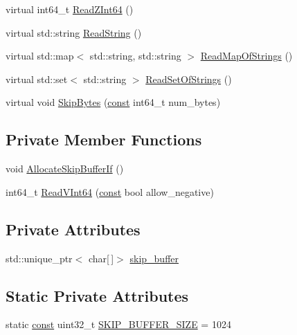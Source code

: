 \begin{DoxyCompactItemize}
\item 
virtual int64\+\_\+t \mbox{\hyperlink{classlucene_1_1core_1_1store_1_1DataInput_a978b9682ae5a7045e3f0181ad32ecaa2}{Read\+Z\+Int64}} ()
\item 
virtual std\+::string \mbox{\hyperlink{classlucene_1_1core_1_1store_1_1DataInput_a86a272d3eaf2f18b68669ce8eb181c85}{Read\+String}} ()
\item 
virtual std\+::map$<$ std\+::string, std\+::string $>$ \mbox{\hyperlink{classlucene_1_1core_1_1store_1_1DataInput_a92ceac1fbe1d997031ecc57bf5e9306a}{Read\+Map\+Of\+Strings}} ()
\item 
virtual std\+::set$<$ std\+::string $>$ \mbox{\hyperlink{classlucene_1_1core_1_1store_1_1DataInput_a7d641dfa95887c123b813308c290b2c5}{Read\+Set\+Of\+Strings}} ()
\item 
virtual void \mbox{\hyperlink{classlucene_1_1core_1_1store_1_1DataInput_a0b083e18dc6254067375f4ac2bc9fefa}{Skip\+Bytes}} (\mbox{\hyperlink{ZlibCrc32_8h_a2c212835823e3c54a8ab6d95c652660e}{const}} int64\+\_\+t num\+\_\+bytes)
\end{DoxyCompactItemize}
\subsection*{Private Member Functions}
\begin{DoxyCompactItemize}
\item 
void \mbox{\hyperlink{classlucene_1_1core_1_1store_1_1DataInput_a6303bc9a57618fdd930404bc8cd65d4d}{Allocate\+Skip\+Buffer\+If}} ()
\item 
int64\+\_\+t \mbox{\hyperlink{classlucene_1_1core_1_1store_1_1DataInput_abdf472f02e6391e659b94f01776bc2b5}{Read\+V\+Int64}} (\mbox{\hyperlink{ZlibCrc32_8h_a2c212835823e3c54a8ab6d95c652660e}{const}} bool allow\+\_\+negative)
\end{DoxyCompactItemize}
\subsection*{Private Attributes}
\begin{DoxyCompactItemize}
\item 
std\+::unique\+\_\+ptr$<$ char\mbox{[}$\,$\mbox{]}$>$ \mbox{\hyperlink{classlucene_1_1core_1_1store_1_1DataInput_a83f28d696cfd51b6ae0fe7b08f0d3ed6}{skip\+\_\+buffer}}
\end{DoxyCompactItemize}
\subsection*{Static Private Attributes}
\begin{DoxyCompactItemize}
\item 
static \mbox{\hyperlink{ZlibCrc32_8h_a2c212835823e3c54a8ab6d95c652660e}{const}} uint32\+\_\+t \mbox{\hyperlink{classlucene_1_1core_1_1store_1_1DataInput_ad7c3e058c1fee4d81e78095303f16d91}{S\+K\+I\+P\+\_\+\+B\+U\+F\+F\+E\+R\+\_\+\+S\+I\+ZE}} = 1024
\end{DoxyCompactItemize}


